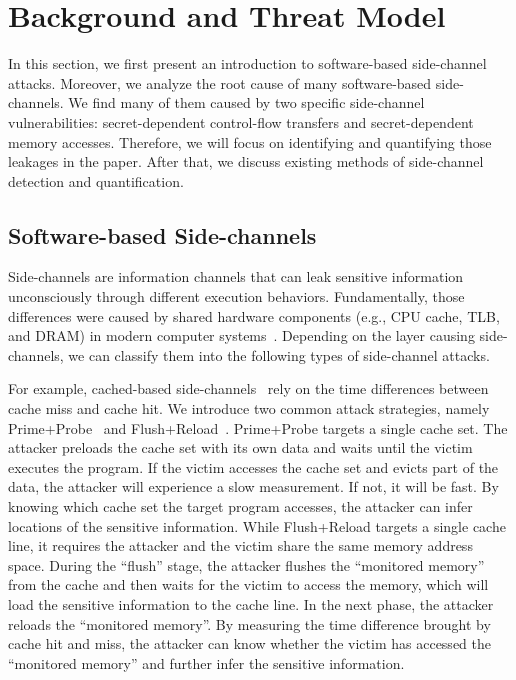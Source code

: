 \section{Background and Threat Model}
In this section, we first present an introduction to software-based side-channel
attacks. Moreover, we analyze the root cause of many software-based
side-channels. We find many of them caused by two specific side-channel
vulnerabilities: secret-dependent control-flow transfers and secret-dependent
memory accesses. Therefore, we will focus on identifying and quantifying those
leakages in the paper. After that, we discuss existing methods of side-channel
detection and quantification.

\subsection{Software-based Side-channels}
Side-channels are information channels that can leak sensitive information
unconsciously through different execution behaviors.  Fundamentally, those
differences were caused by shared hardware components (e.g., CPU cache, TLB, and
DRAM) in modern computer systems~\cite{ge2018survey,szefer2019survey}. Depending
on the layer causing side-channels, we can classify them into the following
types of side-channel attacks.

For example, cached-based
side-channels~\cite{yarom2017cachebleed,191010,184415,7163050,Osvik2006,liu2015last,yarom2014flush+}
rely on the time differences between cache miss and cache hit. We introduce two
common attack strategies, namely Prime+Probe~\cite{liu2015last} and
Flush+Reload~\cite{yarom2014flush+}. Prime+Probe targets a single cache set. The
attacker preloads the cache set with its own data and waits until the victim
executes the program. If the victim accesses the cache set and evicts part of
the data, the attacker will experience a slow measurement. If not, it will be
fast. By knowing which cache set the target program accesses, the attacker can
infer locations of the sensitive information. While Flush+Reload targets a
single cache line, it requires the attacker and the victim share the same memory
address space. During the ``flush'' stage, the attacker flushes the ``monitored
memory'' from the cache and then waits for the victim to access the memory,
which will load the sensitive information to the cache line. In the next phase,
the attacker reloads the ``monitored memory''. By measuring the time difference
brought by cache hit and miss, the attacker can know whether the victim has
accessed the ``monitored memory'' and further infer the sensitive information.

